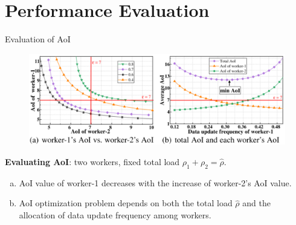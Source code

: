 \documentclass[aspectratio=169,xcolor=dvipsnames]{beamer}
\begin{document}



\section{Performance Evaluation}
\begin{frame}[fragile]{Evaluation of AoI}
    \footnotesize %

    \begin{figure}
        \centering
        \includegraphics[width=0.8\linewidth]{Two_Worker_AoI.png}
    \end{figure}

    \textbf{Evaluating AoI}: two workers, fixed total load \(\rho_1 + \rho_2 = \hat{\rho}\).
    
    \begin{enumerate}[(a)]
        \item AoI value of worker-1 decreases with the increase of worker-2’s AoI value.
        \item AoI optimization problem depends on both the total load \(\hat{\rho}\) and the allocation of data update frequency among workers.
    \end{enumerate}
\end{frame}
\end{document}
